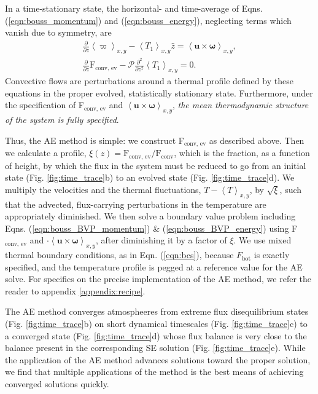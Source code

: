\documentclass[aps, pre, onecolumn, nofootinbib, notitlepage, groupedaddress, amsfonts, amssymb, amsmath, longbibliography]{revtex4-1}
\newcommand{\angles}[1]{\ensuremath{\left\langle #1 \right\rangle}}
\begin{document}
In a time-stationary state, the horizontal- and time-average of
Eqns. (\ref{eqn:bouss_momentum}) and (\ref{eqn:bouss_energy}), neglecting terms which
vanish due to symmetry, are
\begin{gather}
\frac{\partial}{\partial z}\angles{\varpi}_{x,y} - \angles{T_1}_{x,y}\hat{z} = \angles{\bm{u}\times\bm{\omega}}_{x,y},
	\label{eqn:bouss_BVP_momentum}
\\
\frac{\partial}{\partial z}\text{F}_{\text{conv, ev}} - \mathcal{P}\frac{\partial^2}{\partial z^2} \angles{T_1}_{x,y} = 0.
	\label{eqn:bouss_BVP_energy}
\end{gather}
Convective flows
are perturbations around a thermal profile defined by these equations in the proper evolved, 
statistically stationary state. Furthermore, under the specification of
F$_{\text{conv, ev}}$ and $\angles{\bm{u}\times\bm{\omega}}_{x,y}$,
\emph{the mean thermodynamic structure of the system is fully specified}.

Thus, the AE method is simple: we construct F$_{\text{conv, ev}}$ as described above.
Then we calculate a profile, 
$\xi(z) = \text{F}_{\text{conv, ev}}/\text{F}_{\text{conv}}$, which is the fraction,
as a function of height, by which the flux in the system must be reduced to go from
an initial state (Fig. \ref{fig:time_trace}b) to an evolved state (Fig. \ref{fig:time_trace}d).
We multiply the velocities
and the thermal fluctuations, $T - \angles{T}_{x,y}$, by $\sqrt{\xi}$, such 
that the advected, flux-carrying perturbations in the temperature are appropriately
diminished.  We then solve a boundary value problem including
Eqns. (\ref{eqn:bouss_BVP_momentum}) \& (\ref{eqn:bouss_BVP_energy}) using F$_{\text{conv, ev}}$
and $\cdot\angles{\bm{u}\times\bm{\omega}}_{x,y}$, after diminishing it by a factor
of $\xi$. We use mixed thermal boundary conditions, as in Eqn. (\ref{eqn:bcs}),
because $F_{\text{bot}}$ is exactly specified, and the temperature profile is pegged
at a reference value for the AE solve.
For specifics on the precise implementation of the AE method, we refer
the reader to appendix \ref{appendix:recipe}.

The AE method converges atmospheeres from extreme flux disequilibrium states 
(Fig. \ref{fig:time_trace}b) on short dynamical timescales (Fig. \ref{fig:time_trace}c)
to a converged state (Fig. \ref{fig:time_trace}d) whose flux balance is very
close to the balance present in the corresponding SE solution (Fig. \ref{fig:time_trace}e).
While the application of the AE method advances solutions toward the proper solution,
we find that multiple applications of the method is the best means of achieving converged
solutions quickly.
\end{document}
